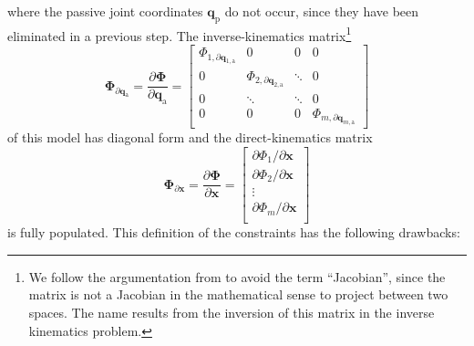 \documentclass[robotics,article,submit,moreauthors,pdftex]{Definitions/mdpi}
\newcommand{\bm}[1]{\boldsymbol{#1}}
\begin{document}
%
where the passive joint coordinates $\bm{q}_{\mathrm{p}}$ do not occur, since they have been eliminated in a previous step.
The inverse-kinematics matrix\footnote{We follow the argumentation from \cite{Gogu2008} to avoid the term ``Jacobian'', since the matrix is not a Jacobian in the mathematical sense to project between two spaces. The name results from the inversion of this matrix in the inverse kinematics problem.}
%
\begin{equation}
\bm{\Phi}_{\partial \bm{q}_{\mathrm{a}}}
=
\frac{\partial \bm{\Phi}}{\partial \bm{q}_{\mathrm{a}}}
=
\begin{bmatrix}
\Phi_{1,\partial \bm{q}_{1,\mathrm{a}}}  & 0 & 0 & 0\\
0 & \Phi_{2,\partial \bm{q}_{2,\mathrm{a}}} & \ddots & 0  \\
0 & \ddots & \ddots & 0  \\
0 & 0 & 0 & \Phi_{m,\partial \bm{q}_{m,\mathrm{a}}}
\end{bmatrix}
\label{equ:PKM_phi_grad_q}
\end{equation}  
%
of this model has diagonal form and the direct-kinematics matrix
%
\begin{equation}
\bm{\Phi}_{\partial \bm{x}}
=
\frac{\partial \bm{\Phi}}{\partial \bm{x}}
=
\begin{bmatrix}
\partial \Phi_1/\partial \bm{x}\\
\partial \Phi_2/\partial \bm{x}\\
\vdots \\
\partial \Phi_m/\partial \bm{x}\\
\end{bmatrix}
\label{equ:PKM_phi_grad_x}
\end{equation}
%
is fully populated.
This definition of the constraints has the following drawbacks:
\end{document}
